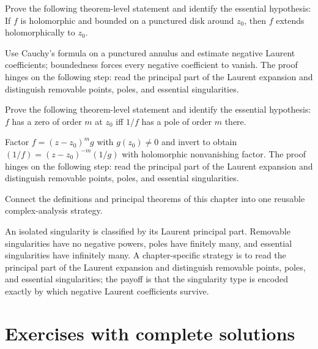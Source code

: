 \begin{problem}\label{prob:iv09-problem-10}
Prove the following theorem-level statement and identify the essential hypothesis: If $f$ is holomorphic and bounded on a punctured disk around $z_0$, then $f$ extends holomorphically to $z_0$.
\end{problem}
\begin{solution}
Use Cauchy's formula on a punctured annulus and estimate negative Laurent coefficients; boundedness forces every negative coefficient to vanish. The proof hinges on the following step: read the principal part of the Laurent expansion and distinguish removable points, poles, and essential singularities.
\end{solution}

\begin{problem}\label{prob:iv09-problem-11}
Prove the following theorem-level statement and identify the essential hypothesis: $f$ has a zero of order $m$ at $z_0$ iff $1/f$ has a pole of order $m$ there.
\end{problem}
\begin{solution}
Factor $f=(z-z_0)^mg$ with $g(z_0)\ne0$ and invert to obtain $(1/f)=(z-z_0)^{-m}(1/g)$ with holomorphic nonvanishing factor. The proof hinges on the following step: read the principal part of the Laurent expansion and distinguish removable points, poles, and essential singularities.
\end{solution}

\begin{problem}\label{prob:iv09-problem-12}
Connect the definitions and principal theorems of this chapter into one reusable complex-analysis strategy.
\end{problem}
\begin{solution}
An isolated singularity is classified by its Laurent principal part. Removable singularities have no negative powers, poles have finitely many, and essential singularities have infinitely many. A chapter-specific strategy is to read the principal part of the Laurent expansion and distinguish removable points, poles, and essential singularities; the payoff is that the singularity type is encoded exactly by which negative Laurent coefficients survive.
\end{solution}

\section{Exercises with complete solutions}

